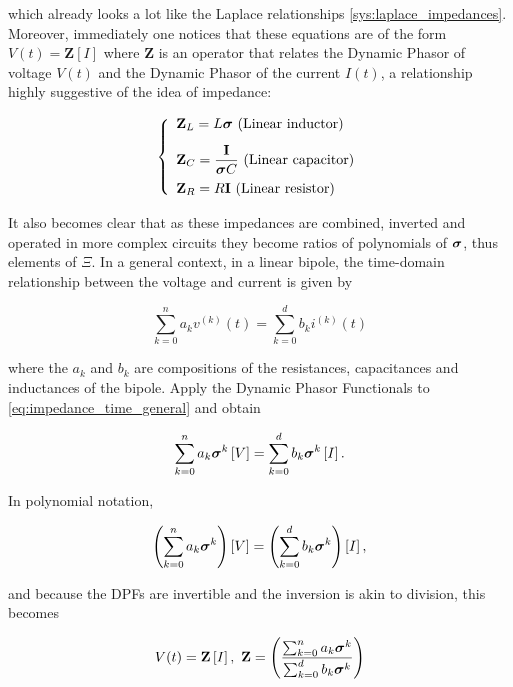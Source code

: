 	\noindent which already looks a lot like the Laplace relationships \eqref{sys:laplace_impedances}. Moreover, immediately one notices that these equations are of the form $V(t) = \mathbf{Z}\left[I\right]$ where $\mathbf{Z}$ is an operator that relates the Dynamic Phasor of voltage $V(t)$ and the Dynamic Phasor of the current $I(t)$, a relationship highly suggestive of the idea of impedance:

\begin{equation}\left\{\begin{array}{l} \mathbf{Z}_L = L \boldsymbol{\sigma} \text{ (Linear inductor)}\\[3mm] \mathbf{Z}_C = \dfrac{\mathbf{I}}{\boldsymbol{\sigma} C} \text{ (Linear capacitor)}\\[3mm] \mathbf{Z}_R = R\mathbf{I} \text{ (Linear resistor)}\end{array} \right. \label{sys:dpo_impedances_formula}\end{equation}

	It also becomes clear that as these impedances are combined, inverted and operated in more complex circuits they become ratios of polynomials of $\boldsymbol{\sigma}$, thus elements of $\Xi$. In a general context, in a linear bipole, the time-domain relationship between the voltage and current is given by

\begin{equation} \sum_{k=0}^n a_k v^{(k)}(t) = \sum_{k=0}^d b_k i^{(k)}(t) \label{eq:impedance_time_general}\end{equation}

	\noindent where the $a_k$ and $b_k$ are compositions of the resistances, capacitances and inductances of the bipole. Apply the Dynamic Phasor Functionals to \eqref{eq:impedance_time_general} and obtain

\begin{equation} \sum_{k=0}^{n} a_k \boldsymbol{\sigma}^k\left[V\right] = \sum_{k=0}^{d} b_k \boldsymbol{\sigma}^k\left[I\right] .\end{equation}

        In polynomial notation,

\begin{equation} \left(\sum_{k=0}^{n} a_k \boldsymbol{\sigma}^k\right)\left[V\right] = \left(\sum_{k=0}^{d} b_k \boldsymbol{\sigma}^k\right)\left[I\right] ,\end{equation}

        \noindent and because the DPFs are invertible and the inversion is akin to division, this becomes

\begin{equation} V(t) = \mathbf{Z} \left[I\right],\ \mathbf{Z} = \left(\dfrac{\sum_{k=0}^{n} a_k \dpo^k}{\sum_{k=0}^{d} b_k \dpo^k}\right) \label{eq:def_impedance}\end{equation}

